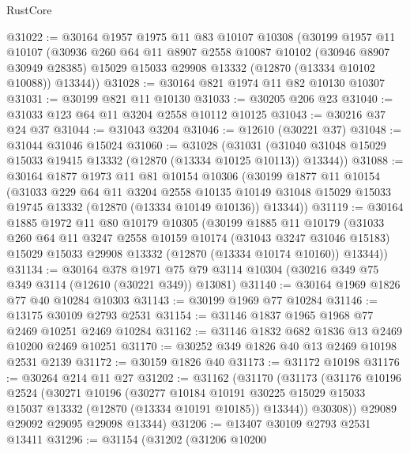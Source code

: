 \begin{lexlean}{RustCore}
\begin{coremodule}
@31022 := @30164
    @1957
    @1975
    @11
    @83
    @10107
    @10308
    (@30199
      @1957
      @11
      @10107
      (@30936
        @260
        @64
        @11
        @8907
        @2558
        @10087
        @10102
        (@30946 @8907 @30949 @28385)
        @15029
        @15033
        @29908
        @13332
        (@12870 (@13334 @10102 @10088))
        @13344))
@31028 := @30164 @821 @1974 @11 @82 @10130 @10307
@31031 := @30199 @821 @11 @10130
@31033 := @30205 @206 @23
@31040 := @31033 @123 @64 @11 @3204 @2558 @10112 @10125
@31043 := @30216 @37 @24 @37
@31044 := @31043 @3204
@31046 := @12610 (@30221 @37)
@31048 := @31044 @31046 @15024
@31060 := @31028
    (@31031 (@31040 @31048 @15029 @15033 @19415 @13332 (@12870 (@13334 @10125 @10113)) @13344))
@31088 := @30164
    @1877
    @1973
    @11
    @81
    @10154
    @10306
    (@30199
      @1877
      @11
      @10154
      (@31033
        @229
        @64
        @11
        @3204
        @2558
        @10135
        @10149
        @31048
        @15029
        @15033
        @19745
        @13332
        (@12870 (@13334 @10149 @10136))
        @13344))
@31119 := @30164
    @1885
    @1972
    @11
    @80
    @10179
    @10305
    (@30199
      @1885
      @11
      @10179
      (@31033
        @260
        @64
        @11
        @3247
        @2558
        @10159
        @10174
        (@31043 @3247 @31046 @15183)
        @15029
        @15033
        @29908
        @13332
        (@12870 (@13334 @10174 @10160))
        @13344))
@31134 := @30164
    @378
    @1971
    @75
    @79
    @3114
    @10304
    (@30216 @349 @75 @349 @3114 (@12610 (@30221 @349)) @13081)
@31140 := @30164 @1969 @1826 @77 @40 @10284 @10303
@31143 := @30199 @1969 @77 @10284
@31146 := @13175 @30109 @2793 @2531
@31154 := @31146 @1837 @1965 @1968 @77 @2469 @10251 @2469 @10284
@31162 := @31146 @1832 @682 @1836 @13 @2469 @10200 @2469 @10251
@31170 := @30252 @349 @1826 @40 @13 @2469 @10198 @2531 @2139
@31172 := @30159 @1826 @40
@31173 := @31172 @10198
@31176 := @30264 @214 @11 @27
@31202 := @31162
    (@31170
      (@31173
        (@31176
          @10196
          @2524
          (@30271
            @10196
            (@30277
              @10184
              @10191
              @30225
              @15029
              @15033
              @15037
              @13332
              (@12870 (@13334 @10191 @10185))
              @13344))
          @30308))
      @29089
      @29092
      @29095
      @29098
      @13344)
@31206 := @13407 @30109 @2793 @2531 @13411
@31296 := @31154
    (@31202
      (@31206
        @10200

\end{coremodule}
\end{lexlean}
